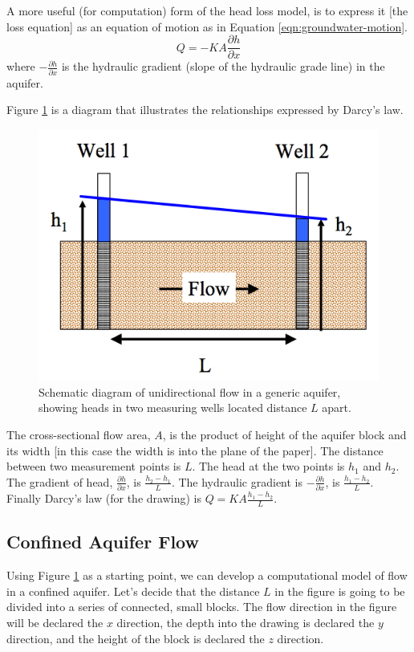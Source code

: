 A more useful (for computation) form of the head loss model, is to express it [the loss equation] as an equation of motion as in Equation \ref{eqn:groundwater-motion}.
\begin{equation}
Q = -KA\frac{\partial h}{\partial x}
\label{eqn:groundwater-motion}
\end{equation}
where $- \frac{\partial h}{\partial x}$ is the hydraulic gradient (slope of the hydraulic grade line) in the aquifer.

Figure \ref{fig:1D-aquifer-flow} is a diagram that illustrates the relationships expressed by Darcy's law.  

\begin{figure}[h!] %
   \centering
   \includegraphics[width=6in]{./16-PorousMediumFlow/1D-aquifer-flow.jpg} 
   \caption{Schematic diagram of unidirectional flow in a generic aquifer, showing heads in two measuring wells located distance $L$ apart.}
   \label{fig:1D-aquifer-flow}
\end{figure}

The cross-sectional flow area, $A$, is the product of height of the aquifer block and its width [in this case the width is into the plane of the paper].
The distance between two measurement points is $L$.
The head at the two points is $h_1$ and $h_2$.
The gradient of head, $\frac{\partial h}{\partial x}$, is $\frac{h_2 - h_1}{L}$.
The hydraulic gradient is  $- \frac{\partial h}{\partial x}$, is $\frac{h_1 - h_2}{L}$.
Finally Darcy's law (for the drawing) is $Q = K A \frac{h_1 - h_2}{L}$.

\subsection{Confined Aquifer Flow}
Using Figure \ref{fig:1D-aquifer-flow} as a starting point, we can develop a computational model of flow in a confined aquifer.
Let's decide that the distance $L$ in the figure is going to be divided into a series of connected, small blocks.
The flow direction in the figure will be declared the $x$ direction, the depth into the drawing is declared the $y$ direction, and the height of the block is declared the $z$ direction.

